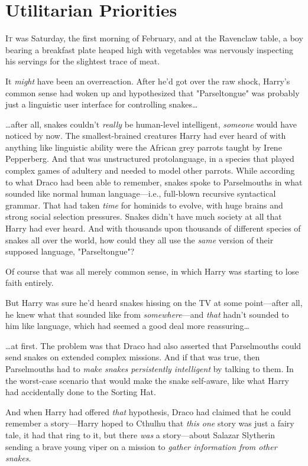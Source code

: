 \chapter{Utilitarian Priorities}

\lettrine{I}{t} was Saturday,
the first morning of February, and at the Ravenclaw table, a boy bearing a
breakfast plate heaped high with vegetables was nervously inspecting his
servings for the slightest trace of meat.

It \emph{might} have been an overreaction. After he'd got over the raw
shock, Harry's common sense had woken up and hypothesized that "Parseltongue"
was probably just a linguistic user interface for controlling snakes{\ldots}

{\ldots}after all, snakes couldn't \emph{really} be human-level intelligent,
\emph{someone} would have noticed by now. The smallest-brained creatures Harry
had ever heard of with anything like linguistic ability were the African grey
parrots taught by Irene Pepperberg. And that was unstructured protolanguage, in
a species that played complex games of adultery and needed to model other
parrots. While according to what Draco had been able to remember, snakes spoke
to Parselmouths in what sounded like normal human language---i.e., full-blown
recursive syntactical grammar. That had taken \emph{time} for hominids to
evolve, with huge brains and strong social selection pressures. Snakes didn't
have much society at all that Harry had ever heard. And with thousands upon
thousands of different species of snakes all over the world, how could they all
use the \emph{same} version of their supposed language, "Parseltongue"?

Of course that was all merely common sense, in which Harry was starting to lose
faith entirely.

But Harry was sure he'd heard snakes hissing on the TV at some point---after
all, he knew what that sounded like from \emph{somewhere}---and \emph{that}
hadn't sounded to him like language, which had seemed a good deal more
reassuring{\ldots}

{\ldots}at first. The problem was that Draco had also asserted that
Parselmouths could send snakes on extended complex missions. And if that was
true, then Parselmouths had to \emph{make snakes persistently intelligent} by
talking to them. In the worst-case scenario that would make the snake
self-aware, like what Harry had accidentally done to the Sorting Hat.

And when Harry had offered \emph{that} hypothesis, Draco had claimed that he
could remember a story---Harry hoped to Cthulhu that \emph{this one} story was
just a fairy tale, it had that ring to it, but there \emph{was} a story---about
Salazar Slytherin sending a brave young viper on a mission to \emph{gather
information from other snakes.}

